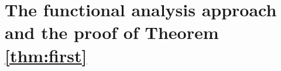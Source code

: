 \documentclass[[a4paper,english,12pt]{amsart}
\theoremstyle{plain}
\theoremstyle{remark}
\newcommand{\magenta}[1]{{\color{magenta}{#1}}}
\begin{document}
%
%
%
%
%
%
%
%
%
%
%

\section{The functional analysis approach and the proof of Theorem \ref{thm:first}}
\label{sec:discrete}
\end{document}
